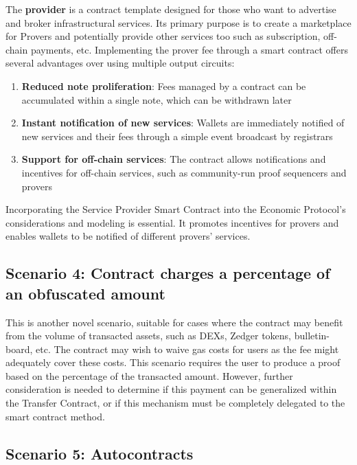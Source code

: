\documentclass[twocolumn, nofootinbib]{revtex4-2} %
\newcommand{\emphathize}[1]{\textbf{#1}\xspace}
\newcommand{\provider}{\emphathize{provider}}
\begin{document}
    The \provider is a contract template designed for those who want to
    advertise and broker infrastructural services.
    Its primary purpose is to create a marketplace for Provers and potentially
    provide other services too such as subscription, off-chain payments, etc.
    Implementing the prover fee through a smart contract offers several
    advantages over using multiple output circuits:

    \begin{enumerate}
        \item \textbf{Reduced note proliferation}: Fees managed by a contract
              can be accumulated within a single note, which can be withdrawn
              later
        \item \textbf{Instant notification of new services}: Wallets are
              immediately notified of new services and their fees through a
              simple event broadcast by registrars
        \item \textbf{Support for off-chain services}: The contract allows
              notifications and incentives for off-chain services, such as
              community-run proof sequencers and provers
    \end{enumerate}

    Incorporating the Service Provider Smart Contract into the Economic
    Protocol's considerations and modeling is essential.
    It promotes incentives for provers and enables wallets to be notified of
    different provers' services.

    \subsection{Scenario 4: Contract charges a percentage of an obfuscated amount}\label{sec:specifications:scenario-4}
    This is another novel scenario, suitable for cases where the contract may
    benefit from the volume of transacted assets, such as DEXs, Zedger tokens,
    bulletin-board, etc.
    The contract may wish to waive gas costs for users as the fee might
    adequately cover these costs.
    This scenario requires the user to produce a proof based on the percentage
    of the transacted amount.
    However, further consideration is needed to determine if this payment can
    be generalized within the Transfer Contract, or if this mechanism must be
    completely delegated to the smart contract method.

    \subsection{Scenario 5: Autocontracts}\label{sec:specifications:scenario-5}
\end{document}

